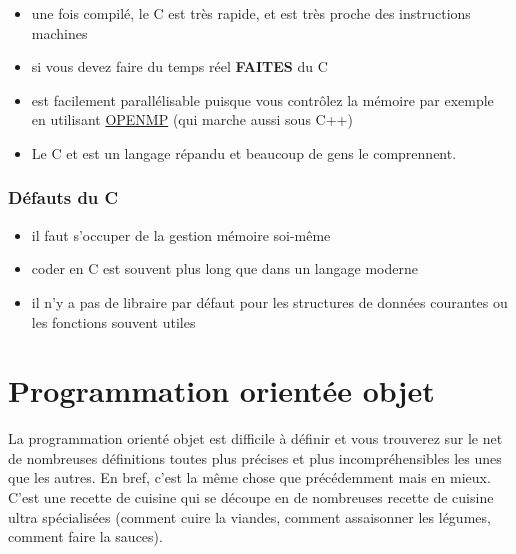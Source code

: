 \begin{itemize}
\item une fois compilé, le C est très rapide, et est très proche des instructions machines
\item si  vous devez faire du temps réel \textbf{FAITES} du C
\item est facilement parallélisable puisque vous contrôlez la mémoire
par exemple en utilisant \href{http://openmp.org/}{OPENMP} (qui marche aussi sous C++)
\item Le C et est un langage répandu et beaucoup de gens le comprennent.	
\end{itemize}

\subsubsection*{Défauts du C}

\begin{itemize}
\item il faut s'occuper de la gestion mémoire soi-même
\item coder en C est souvent plus long que dans un langage moderne
\item il n'y a pas de libraire par défaut pour les structures de données courantes ou les fonctions souvent utiles
\end{itemize}

\section{Programmation orientée objet}

La programmation orienté objet est difficile à définir et vous trouverez sur le net de nombreuses 
définitions toutes plus précises et plus incompréhensibles les unes que les autres.
 En bref, c'est la même chose que précédemment mais en mieux. C'est une recette de cuisine qui se 
découpe en de nombreuses recette de cuisine ultra spécialisées (comment cuire la viandes,
 comment assaisonner les légumes, comment faire la sauces).\\


